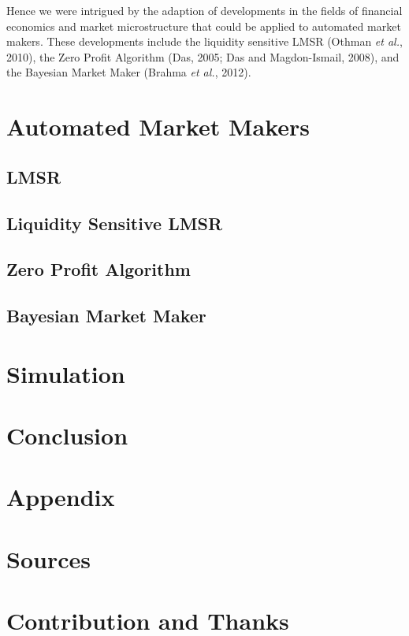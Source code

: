 \documentclass[11pt,a4paper]{article}
\begin{document}
Hence we were intrigued by the adaption of developments in the fields of financial economics and market microstructure that could be applied to automated market makers. These developments include the liquidity sensitive LMSR (Othman \emph{et al.}, 2010), the Zero Profit Algorithm (Das, 2005; Das and Magdon-Ismail, 2008), and the Bayesian Market Maker (Brahma \emph{et al.}, 2012). 
\section*{Automated Market Makers}
\subsection*{LMSR}
\subsection*{Liquidity Sensitive LMSR}
\subsection*{Zero Profit Algorithm}
\subsection*{Bayesian Market Maker}
\section*{Simulation}
\section*{Conclusion}
\section*{Appendix}
\section*{Sources}
\section*{Contribution and Thanks}
\end{document}
